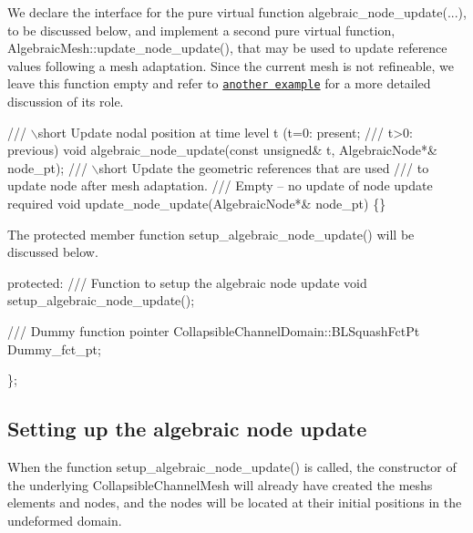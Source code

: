 We declare the interface for the pure virtual function {\ttfamily algebraic\+\_\+node\+\_\+update}(...), to be discussed below, and implement a second pure virtual function, {\ttfamily Algebraic\+Mesh\+::update\+\_\+node\+\_\+update()}, that may be used to update reference values following a mesh adaptation. Since the current mesh is not refineable, we leave this function empty and refer to \href{../../../interaction/fsi_collapsible_channel_adapt/html/index.html}{\tt another example} for a more detailed discussion of its role.


\begin{DoxyCodeInclude}
 \textcolor{comment}{/// \(\backslash\)short Update nodal position at time level t (t=0: present; }
\textcolor{comment}{ /// t>0: previous)}
\textcolor{comment}{} \textcolor{keywordtype}{void} algebraic\_node\_update(\textcolor{keyword}{const} \textcolor{keywordtype}{unsigned}& t, AlgebraicNode*& node\_pt);
 \textcolor{comment}{}
\textcolor{comment}{ /// \(\backslash\)short Update the geometric references that are used }
\textcolor{comment}{ /// to update node after mesh adaptation.}
\textcolor{comment}{ /// Empty -- no update of node update required}
\textcolor{comment}{} \textcolor{keywordtype}{void} update\_node\_update(AlgebraicNode*& node\_pt) \{\}

\end{DoxyCodeInclude}


The protected member function {\ttfamily setup\+\_\+algebraic\+\_\+node\+\_\+update()} will be discussed below.


\begin{DoxyCodeInclude}
\textcolor{keyword}{protected}:
\textcolor{comment}{}
\textcolor{comment}{ /// Function to setup the algebraic node update}
\textcolor{comment}{} \textcolor{keywordtype}{void} setup\_algebraic\_node\_update();

\textcolor{comment}{}
\textcolor{comment}{ /// Dummy function pointer }
\textcolor{comment}{} CollapsibleChannelDomain::BLSquashFctPt Dummy\_fct\_pt;

\};

\end{DoxyCodeInclude}




\hypertarget{index_setting_up}{}\subsection{Setting up the algebraic node update}\label{index_setting_up}
When the function {\ttfamily setup\+\_\+algebraic\+\_\+node\+\_\+update()} is called, the constructor of the underlying {\ttfamily Collapsible\+Channel\+Mesh} will already have created the mesh\textquotesingle{}s elements and nodes, and the nodes will be located at their initial positions in the undeformed domain.

